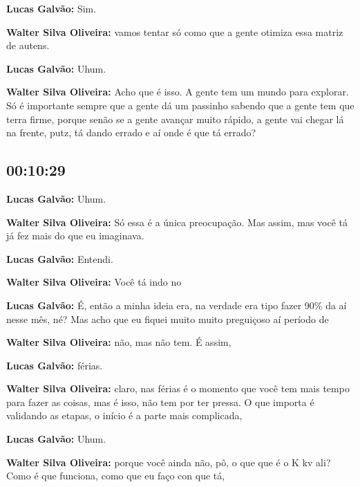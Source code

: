 \textbf{Lucas Galvão:} Sim.



\textbf{Walter Silva Oliveira:} vamos tentar só como que a gente otimiza essa matriz de autens.



\textbf{Lucas Galvão:} Uhum.



\textbf{Walter Silva Oliveira:} Acho que é isso. A gente tem um mundo para explorar. Só é importante sempre que a gente dá um passinho sabendo que a gente tem que terra firme, porque senão se a gente avançar muito rápido, a gente vai chegar lá na frente, putz, tá dando errado e aí onde é que tá errado?



\subsection{\textbf{00:10:29}}



\textbf{Lucas Galvão:} Uhum.



\textbf{Walter Silva Oliveira:} Só essa é a única preocupação. Mas assim, mas você tá já fez mais do que eu imaginava.



\textbf{Lucas Galvão:} Entendi.



\textbf{Walter Silva Oliveira:} Você tá indo no



\textbf{Lucas Galvão:} É, então a minha ideia era, na verdade era tipo fazer 90\% da aí nesse mês, né? Mas acho que eu fiquei muito muito preguiçoso aí período de



\textbf{Walter Silva Oliveira:} não, mas não tem. É assim,



\textbf{Lucas Galvão:} férias.



\textbf{Walter Silva Oliveira:} claro, nas férias é o momento que você tem mais tempo para fazer as coisas, mas é isso, não tem por ter pressa. O que importa é validando as etapas, o início é a parte mais complicada,



\textbf{Lucas Galvão:} Uhum.



\textbf{Walter Silva Oliveira:} porque você ainda não, pô, o que que é o K kv ali? Como é que funciona, como que eu faço con que tá,



